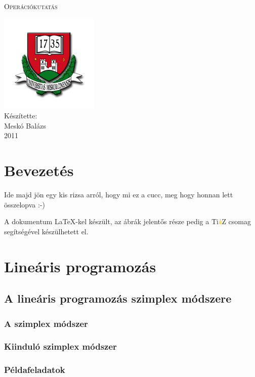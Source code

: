 \documentclass[a4paper,12pt,svgnames]{report}
\begin{document}
\thispagestyle{empty}
\centerline{\huge \textsc{O}\textsc{perációkutatás}}
\begin{center}
\includegraphics[scale=2]{kepek/me.pdf}\\\medskip
Készítette:\\
{\LARGE Meskó Balázs \\}\medskip
{\large 2011}
\end{center}
\pagebreak

\tableofcontents


\chapter{Bevezetés}

Ide majd jön egy kis rizsa arról, hogy mi ez a cucc, meg hogy honnan lett összelopva :-)

A dokumentum \LaTeX-kel készült, az ábrák jelentős része pedig a Ti\textcolor{orange}{\emph{k}}Z csomag segítségével készülhetett el.

\chapter{Lineáris programozás}

\section{A lineáris programozás szimplex módszere}

\subsection{A szimplex módszer}

\subsection{Kiinduló szimplex módszer}

\subsection{Példafeladatok}
\end{document}
